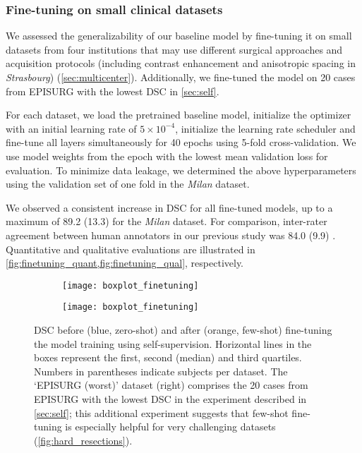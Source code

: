 \subsubsection{Fine-tuning on small clinical datasets}

We assessed the generalizability of our baseline model by fine-tuning it on small datasets from four institutions that may use different surgical approaches and acquisition protocols (including contrast enhancement and anisotropic spacing in \textit{Strasbourg}) (\cref{sec:multicenter}).
Additionally, we fine-tuned the model on 20 cases from EPISURG with the lowest \ac{DSC} in \cref{sec:self}.

For each dataset, we load the pretrained baseline model, initialize the optimizer with an initial learning rate of $5 \times 10^{-4}$, initialize the learning rate scheduler and fine-tune all layers simultaneously for 40 epochs using 5-fold cross-validation.
We use model weights from the epoch with the lowest mean validation loss for evaluation.
To minimize data leakage, we determined the above hyperparameters using the validation set of one fold in the \textit{Milan} dataset.

We observed a consistent increase in \ac{DSC} for all fine-tuned models, up to a maximum of 89.2 (13.3) for the \textit{Milan} dataset.
For comparison, inter-rater agreement between human annotators in our previous study was 84.0 (9.9) \cite{perez-garcia_simulation_2020}.
Quantitative and qualitative evaluations are illustrated in \cref{fig:finetuning_quant,fig:finetuning_qual}, respectively.


\begin{figure}
  \centering
  \begin{subfigure}[b]{0.70\linewidth}
    \centering
    \texttt{[image: boxplot\_finetuning]}
  \end{subfigure}
  \hfill
  \begin{subfigure}[b]{0.205\linewidth}
    \centering
    \texttt{[image: boxplot\_finetuning]}
  \end{subfigure}
  \caption[Dice score without before and after fine-tuning]{
    \acf{DSC} before (blue, zero-shot) and after (orange, few-shot) fine-tuning the model training using self-supervision.
    Horizontal lines in the boxes represent the first, second (median) and third quartiles.
    Numbers in parentheses indicate subjects per dataset.
    The `EPISURG (worst)' dataset (right) comprises the 20 cases from EPISURG with the lowest \ac{DSC} in the experiment described in \cref{sec:self}; this additional experiment suggests that few-shot fine-tuning is especially helpful for very challenging datasets (\cref{fig:hard_resections}).
  }
  \label{fig:finetuning_quant}
\end{figure}


